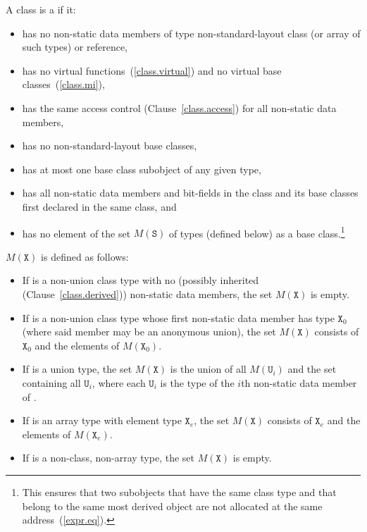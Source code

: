 %
%
\pnum
A class  is a  if it:
\begin{itemize}
\item has no non-static data members of type non-standard-layout class
(or array of such types) or reference,

\item has no virtual functions~(\ref{class.virtual}) and no
virtual base classes~(\ref{class.mi}),

\item has the same access control (Clause~\ref{class.access})
for all non-static data members,

\item has no non-standard-layout base classes,

\item has at most one base class subobject of any given type,

\item has all non-static data members and bit-fields in the class and
its base classes first declared in the same class, and

\item has no element of the set $M(\mathtt{S})$ of types (defined below)
as a base class.\footnote{This ensures that two subobjects that have the
same class type and that
belong to the same most derived object are not allocated at the same
address~(\ref{expr.eq}).}
\end{itemize}

$M(\mathtt{X})$ is defined as follows:
\begin{itemize}
\item If  is a non-union class type with no (possibly
inherited (Clause~\ref{class.derived})) non-static data members, the set
$M(\mathtt{X})$ is empty.

\item If  is a non-union class type whose first non-static data
member has type $\mathtt{X}_0$ (where said member may be an anonymous union),
the set $M(\mathtt{X})$ consists of $\mathtt{X}_0$ and the elements of
$M(\mathtt{X}_0)$.

\item If  is a union type, the set $M(\mathtt{X})$ is
the union of all $M(\mathtt{U}_i)$ and the set containing all $\mathtt{U}_i$,
where each $\mathtt{U}_i$ is the type of the $i$th non-static data member
of .

\item If  is an array type with element type $\mathtt{X}_e$,
the set $M(\mathtt{X})$ consists of $\mathtt{X}_e$
and the elements of $M(\mathtt{X}_e)$.

\item If  is a non-class, non-array type, the set $M(\mathtt{X})$ is empty.
\end{itemize}

